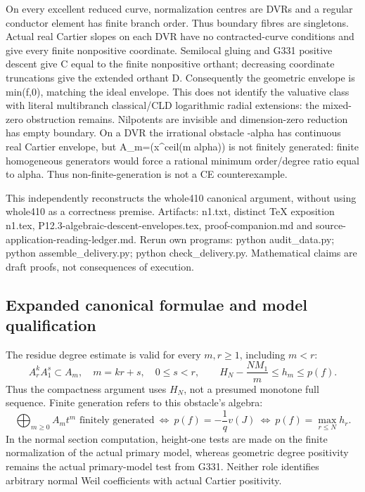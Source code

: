 On every excellent reduced curve, normalization centres are DVRs and a regular conductor element has finite branch order. Thus boundary fibres are singletons. Actual real Cartier slopes on each DVR have no contracted-curve conditions and give every finite nonpositive coordinate. Semilocal gluing and G331 positive descent give C equal to the finite nonpositive orthant; decreasing coordinate truncations give the extended orthant D. Consequently the geometric envelope is min(f,0), matching the ideal envelope. This does not identify the valuative class with literal multibranch classical/CLD logarithmic radial extensions: the mixed-zero obstruction remains. Nilpotents are invisible and dimension-zero reduction has empty boundary. On a DVR the irrational obstacle -alpha has continuous real Cartier envelope, but A\_m=(x\textasciicircum{}ceil(m alpha)) is not finitely generated: finite homogeneous generators would force a rational minimum order/degree ratio equal to alpha. Thus non-finite-generation is not a CE counterexample.

This independently reconstructs the whole410 canonical argument, without using whole410 as a correctness premise. Artifacts: n1.txt, distinct TeX exposition n1.tex, P12.3-algebraic-descent-envelopes.tex, proof-companion.md and source-application-reading-ledger.md. Rerun own programs: python audit\_data.py; python assemble\_delivery.py; python check\_delivery.py. Mathematical claims are draft proofs, not consequences of execution.

\subsection*{Expanded canonical formulae and model qualification}
The residue degree estimate is valid for every $m,r\ge1$, including $m<r$:
\[
 A_r^kA_1^s\subset A_m,\quad m=kr+s,\quad0\le s<r,
 \qquad H_N-\frac{NM_1}{m}\le h_m\le p(f).
\]
Thus the compactness argument uses $H_N$, not a presumed monotone full
sequence.  Finite generation refers to this obstacle's algebra:
\[
 \bigoplus_{m\ge0}A_mt^m\text{ finitely generated}
 \ \Longleftrightarrow\ p(f)=-\frac1qv(J)
 \ \Longleftrightarrow\ p(f)=\max_{r\le N}h_r.
\]
In the normal section computation, height-one tests are made on the
finite normalization of the actual primary model, whereas geometric degree
positivity remains the actual primary-model test from G331.  Neither role
identifies arbitrary normal Weil coefficients with actual Cartier positivity.

